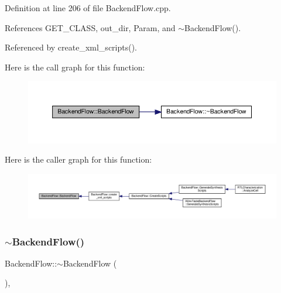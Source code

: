 Definition at line 206 of file Backend\+Flow.\+cpp.



References G\+E\+T\+\_\+\+C\+L\+A\+SS, out\+\_\+dir, Param, and $\sim$\+Backend\+Flow().



Referenced by create\+\_\+xml\+\_\+scripts().

Here is the call graph for this function\+:
\nopagebreak
\begin{figure}[H]
\begin{center}
\leavevmode
\includegraphics[width=350pt]{da/d75/classBackendFlow_a97358ef6c622ed1f7ffc439e6f3372af_cgraph}
\end{center}
\end{figure}
Here is the caller graph for this function\+:
\nopagebreak
\begin{figure}[H]
\begin{center}
\leavevmode
\includegraphics[width=350pt]{da/d75/classBackendFlow_a97358ef6c622ed1f7ffc439e6f3372af_icgraph}
\end{center}
\end{figure}
\mbox{\label{classBackendFlow_ae37237c3e94c8505422c9c668c97dce5}} 
\subsubsection{\texorpdfstring{$\sim$\+Backend\+Flow()}{~BackendFlow()}}
{\footnotesize\ttfamily Backend\+Flow\+::$\sim$\+Backend\+Flow (\begin{DoxyParamCaption}{ }\end{DoxyParamCaption})\hspace{0.3cm}{\ttfamily [virtual]}, {\ttfamily [default]}}



